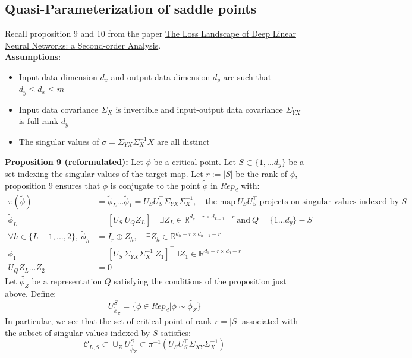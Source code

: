 \documentclass{article}
\theoremstyle{definition}
\begin{document}
\subsection{Quasi-Parameterization of saddle points}
Recall proposition 9 and 10 from the paper \href{https://arxiv.org/pdf/2107.13289}{The Loss Landscape of Deep Linear Neural Networks: a Second-order
Analysis}.
\\
\textbf{Assumptions}:
\begin{itemize}
    \item Input data dimension $d_x$ and output data dimension $d_y$ are such that $d_y \leq d_x \leq m$
    \item Input data covariance $\Sigma_X$ is invertible and input-output data covariance $\Sigma_{YX}$ is full rank $d_y$
    \item The singular values of $\sigma = \Sigma_{YX}\Sigma_{X}^{-1}X$ are all distinct
\end{itemize}
\textbf{Proposition 9 (reformulated):}
Let $\phi$ be a critical point. Let $S\subset \{1,...d_y\}$ be a set indexing the singular values of the target map. Let $r:=|S|$ be the rank of $\phi$, proposition 9 ensures that $\phi$ is conjugate to the point $\tilde{\phi}$ in $Rep_d$ with:
\begin{align*}
    \pi(\tilde{\phi}) & = \tilde{\phi}_L...\tilde{\phi}_1 = U_SU_S^{\top}\Sigma_{YX}\Sigma_{X}^{-1}, \quad \text{the map} \ U_SU_S^{\top} \ \text{projects on singular values indexed by } S \\
    \tilde{\phi}_L & = [U_S \ U_QZ_L ] \quad \exists Z_L\in\mathbb{R}^{d_y-r \times d_{L-1} - r} \ \text{and} \ Q=\{1...d_y\} - S\\
    \forall h\in\{L-1,...,2\}, \ \tilde{\phi}_h & = I_r \oplus Z_h,  \quad \exists Z_h\in\mathbb{R}^{d_h-r \times d_{h-1} - r}\\
    \tilde{\phi}_1 & = [U_S^{\top}\Sigma_{YX}\Sigma_{X}^{-1} \ Z_1]^{\top} \exists Z_1\in\mathbb{R}^{d_1-r \times d_{0} - r}\\
    U_QZ_L...Z_2 & = 0
\end{align*}
Let $\tilde{\phi_Z}$ be a representation $Q$ satisfying the conditions of the proposition just above. Define:
\begin{equation*}
    U_{\tilde{\phi}_Z}^S = \{\phi\in Rep_d|\phi \sim \tilde{\phi_Z}\}
\end{equation*}
In particular, we see that the set of critical point of rank $r=|S|$ associated with the subset of singular values indexed by $S$ satisfies: $$\mathcal{C}_{L,S} \subset \cup_Z U_{\tilde{\phi_Z}}^S \subset \pi^{-1}(U_SU_S^{\top}\Sigma_{XY}\Sigma_{X}^{-1}) $$
\end{document}
